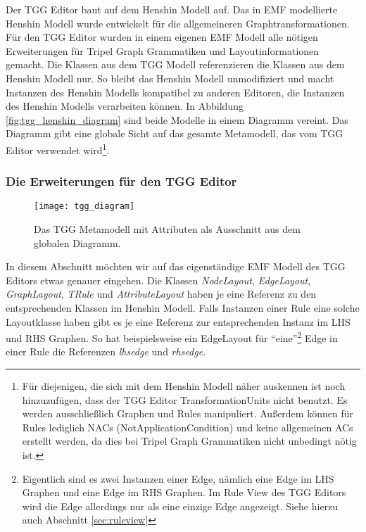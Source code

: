 Der TGG Editor baut auf dem Henshin Modell auf. Das in EMF modellierte Henshin Modell wurde entwickelt für die allgemeineren Graphtransformationen. Für den TGG Editor wurden in einem eigenen EMF Modell alle nötigen Erweiterungen für Tripel Graph Grammatiken und Layoutinformationen gemacht. Die Klassen aus dem TGG Modell referenzieren die Klassen aus dem Henshin Modell nur. So bleibt das Henshin Modell unmodifiziert und macht Instanzen des Henshin Modells kompatibel zu anderen Editoren, die Instanzen des Henshin Modells verarbeiten können. In Abbildung \ref{fig:tgg_henshin_diagram} sind beide Modelle in einem Diagramm vereint. Das Diagramm gibt eine globale Sicht auf das gesamte Metamodell, das vom TGG Editor verwendet wird\footnote{Für diejenigen, die sich mit dem Henshin Modell näher auskennen ist noch hinzuzufügen, dass der TGG Editor TransformationUnits nicht benutzt. Es werden ausschließlich Graphen und Rules manipuliert. Außerdem können für Rules lediglich NACs (NotApplicationCondition) und keine allgemeinen ACs erstellt werden, da dies bei Tripel Graph Grammatiken nicht unbedingt nötig ist.}.

\subsubsection{Die Erweiterungen für den TGG Editor}
\begin{figure}[htbp]
	\centering %
	\texttt{[image: tgg\_diagram]}
	\caption[TGG Metamodell]{Das TGG Metamodell mit Attributen als Ausschnitt aus
	dem globalen Diagramm.}
	\label{fig:tgg_diagram}
\end{figure}

In diesem Abschnitt möchten wir auf das eigenständige EMF Modell des TGG Editors etwas genauer eingehen. Die Klassen \emph{NodeLayout}, \emph{EdgeLayout}, \emph{GraphLayout}, \emph{TRule} und \emph{AttributeLayout} haben je eine Referenz zu den entsprechenden Klassen im Henshin Modell. Falls Instanzen einer Rule eine solche Layoutklasse haben gibt es je eine Referenz zur entsprechenden Instanz im LHS und RHS Graphen. So hat beispielsweise ein EdgeLayout für "`eine"'\footnote{Eigentlich sind es zwei Instanzen einer Edge, nämlich eine Edge im LHS Graphen und eine Edge im RHS Graphen. Im Rule View des TGG Editors wird die Edge allerdings nur als eine einzige Edge angezeigt. Siehe hierzu auch Abschnitt \ref{sec:ruleview}} Edge in einer Rule die Referenzen \emph{lhsedge} und \emph{rhsedge}.

